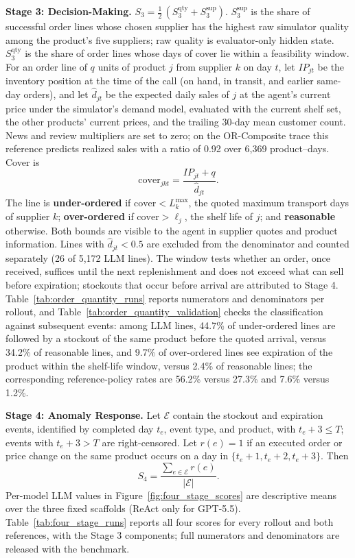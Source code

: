 \textbf{Stage 3: Decision-Making.} $S_3=\tfrac12\,(S_3^{\mathrm{qty}}+S_3^{\mathrm{sup}})$.
$S_3^{\mathrm{sup}}$ is the share of successful order lines whose chosen supplier has the highest raw simulator quality among the product's five suppliers; raw quality is evaluator-only hidden state.
$S_3^{\mathrm{qty}}$ is the share of order lines whose days of cover lie within a feasibility window. For an order line of $q$ units of product $j$ from supplier $k$ on day $t$, let $IP_{jt}$ be the inventory position at the time of the call (on hand, in transit, and earlier same-day orders), and let $\hat d_{jt}$ be the expected daily sales of $j$ at the agent's current price under the simulator's demand model, evaluated with the current shelf set, the other products' current prices, and the trailing 30-day mean customer count. News and review multipliers are set to zero; on the OR-Composite trace this reference predicts realized sales with a ratio of 0.92 over 6{,}369 product--days. Cover is
\begin{equation}
\mathrm{cover}_{jkt}=\frac{IP_{jt}+q}{\hat d_{jt}}.
\end{equation}
The line is \textbf{under-ordered} if $\mathrm{cover}<L^{\max}_{k}$, the quoted maximum transport days of supplier $k$; \textbf{over-ordered} if $\mathrm{cover}>\ell_j$, the shelf life of $j$; and \textbf{reasonable} otherwise. Both bounds are visible to the agent in supplier quotes and product information. Lines with $\hat d_{jt}<0.5$ are excluded from the denominator and counted separately (26 of 5{,}172 LLM lines). The window tests whether an order, once received, suffices until the next replenishment and does not exceed what can sell before expiration; stockouts that occur before arrival are attributed to Stage 4. Table~\ref{tab:order_quantity_runs} reports numerators and denominators per rollout, and Table~\ref{tab:order_quantity_validation} checks the classification against subsequent events: among LLM lines, 44.7\% of under-ordered lines are followed by a stockout of the same product before the quoted arrival, versus 34.2\% of reasonable lines, and 9.7\% of over-ordered lines see expiration of the product within the shelf-life window, versus 2.4\% of reasonable lines; the corresponding reference-policy rates are 56.2\% versus 27.3\% and 7.6\% versus 1.2\%.




\textbf{Stage 4: Anomaly Response.} Let $\mathcal{E}$ contain the stockout and expiration events, identified by completed day $t_e$, event type, and product, with $t_e+3\leq T$; events with $t_e+3>T$ are right-censored. Let $r(e)=1$ if an executed order or price change on the same product occurs on a day in $\{t_e+1,t_e+2,t_e+3\}$. Then
\begin{equation}
S_4=\frac{\sum_{e\in\mathcal{E}}r(e)}{|\mathcal{E}|}.
\end{equation}
Per-model LLM values in Figure~\ref{fig:four_stage_scores} are descriptive means over the three fixed scaffolds (ReAct only for GPT-5.5). Table~\ref{tab:four_stage_runs} reports all four scores for every rollout and both references, with the Stage 3 components; full numerators and denominators are released with the benchmark.

